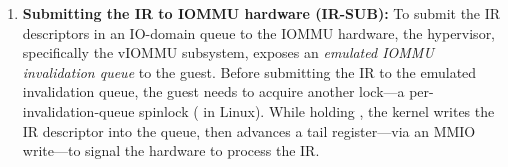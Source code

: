 \begin{enumerate}
\item {\bf Submitting the IR to IOMMU hardware (IR-SUB):} 
To submit the IR descriptors in an IO-domain 
    queue to the IOMMU hardware, 
    the hypervisor, specifically the vIOMMU subsystem, exposes 
    an {\it emulated IOMMU invalidation queue} to the guest.
Before submitting the IR to the emulated invalidation queue, the guest needs to acquire another lock---a 
    per-invalidation-queue spinlock ( in Linux). 
    While holding , the kernel writes the IR descriptor into the queue, 
    then advances a tail register---via an MMIO write---to signal the hardware 
    to process the IR. 
\end{enumerate}







